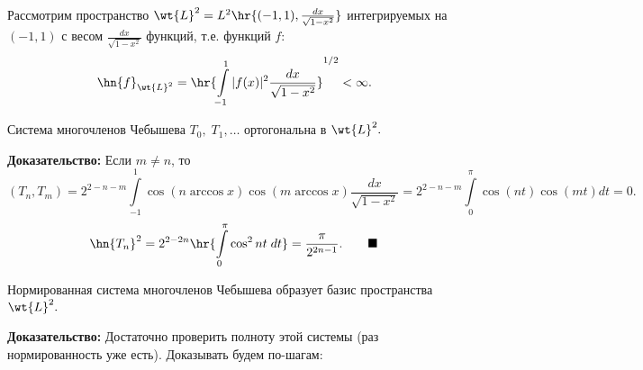 \documentclass[a4paper]{article}
\begin{document}
Рассмотрим пространство
$\wt{L}^2=L^2\hr{(-1,1),\frac{dx}{\sqrt{1-x^2}}}$
интегрируемых на $(-1,1)$ с весом $\frac{dx}{\sqrt{1-x^2}}$
функций, т.е. функций $f$:
$$\hn{f}_{\wt{L}^2}=\hr{\int\limits_{-1}^1|f(x)|^2\frac{dx}{\sqrt{1-x^2}}}^{1/2}<\infty.$$
\begin{theorems}
Система многочленов Чебышева $T_0,\;T_1,\dots$ ортогональна в
$\wt{L}^2.$
\end{theorems}
\textbf{Доказательство:} Если $m\neq n$, то
$$(T_n,T_m)=2^{2-n-m}\int\limits_{-1}^1\cos(n\arccos
x)\cos(m\arccos
x)\frac{dx}{\sqrt{1-x^2}}=2^{2-n-m}\int\limits_0^{\pi}\cos(nt)\cos(mt)dt=0.$$
$$\hn{T_n}^2=2^{2-2n}\hr{\int\limits_0^{\pi}\cos^2nt\;dt}=\frac{\pi}{2^{2n-1}}.\qquad\blacksquare$$
\begin{theorems}
Нормированная система многочленов Чебышева образует базис
пространства $\wt{L}^2.$
\end{theorems}
\textbf{Доказательство:} Достаточно проверить полноту этой системы
(раз нормированность уже есть). Доказывать будем по-шагам:
\end{document}
